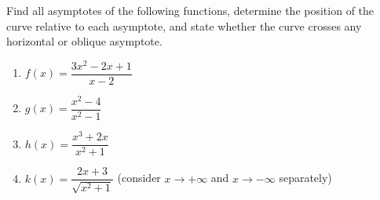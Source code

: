 \documentclass[11pt]{article}
\begin{document}
\begin{exercice}
Find all asymptotes of the following functions, determine the position of the curve relative to each asymptote, and state whether the curve crosses any horizontal or oblique asymptote.
\begin{enumerate}
\item $f(x) = \dfrac{3x^2 - 2x + 1}{x - 2}$
\item $g(x) = \dfrac{x^2 - 4}{x^2 - 1}$
\item $h(x) = \dfrac{x^3 + 2x}{x^2 + 1}$
\item $k(x) = \dfrac{2x + 3}{\sqrt{x^2 + 1}}$ (consider $x \to +\infty$ and $x \to -\infty$ separately)
\end{enumerate}
\end{exercice}
\end{document}
